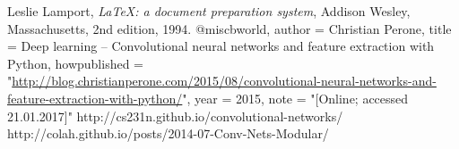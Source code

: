 \documentclass[12pt]{beamer}
\begin{document}
%
%
%
%



\begin{thebibliography}{9}
\small
{}
  Leslie Lamport,
  \emph{\LaTeX: a document preparation system},
  Addison Wesley, Massachusetts,
  2nd edition,
  1994.
@misc{bworld,
  author = {Christian Perone},
  title = {{Deep learning – Convolutional neural networks and feature extraction with Python}},
  howpublished = "\url{http://blog.christianperone.com/2015/08/convolutional-neural-networks-and-feature-extraction-with-python/}",
  year = {2015}, 
  note = "[Online; accessed 21.01.2017]"
}
http://cs231n.github.io/convolutional-networks/
http://colah.github.io/posts/2014-07-Conv-Nets-Modular/
\end{thebibliography}
\end{document}
